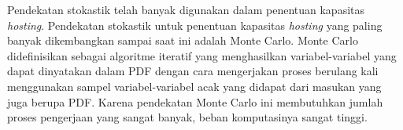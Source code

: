 {{Pendekatan stokastik telah banyak digunakan dalam penentuan kapasitas \textit{hosting}\cite{Dubey2017,Ding2017,Bollen2017,Torquato2018,Vergara2020,Deakin2019}.
Pendekatan stokastik untuk penentuan kapasitas \textit{hosting} yang paling banyak dikembangkan sampai saat ini adalah Monte Carlo. 
Monte Carlo didefinisikan sebagai algoritme iteratif yang menghasilkan variabel-variabel yang dapat dinyatakan dalam PDF dengan cara mengerjakan proses berulang kali menggunakan sampel variabel-variabel acak yang didapat dari masukan yang juga berupa PDF. Karena pendekatan Monte Carlo ini membutuhkan jumlah proses pengerjaan yang sangat banyak, beban komputasinya sangat tinggi. 

}}
